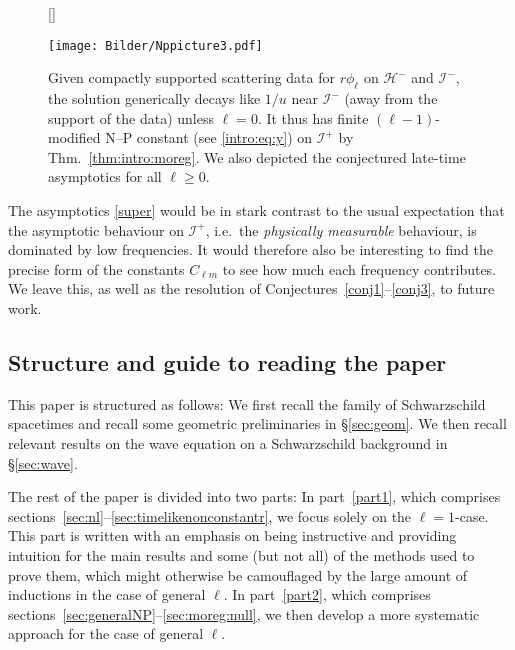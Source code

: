 \documentclass[11pt,english]{article}
\numberwithin{equation}{section}
\theoremstyle{remark}
\theoremstyle{plain}
\theoremstyle{remark}
\renewcommand{\(}{\left(}
\renewcommand{\)}{\right)}
\begin{document}
\begin{figure}[htbp]
[\FBwidth]
{\caption{%
Given compactly supported scattering data for $r\phi_\ell$ on $\mathcal H^-$ and $\mathcal I^-$, the solution generically decays like $1/u$ near $\mathcal I^-$ (away from the support of the data) unless $\ell=0$. It thus has finite $(\ell-1)$-modified N--P constant (see \eqref{intro:eq:y}) on $\mathcal I^+$ by Thm.~\ref{thm:intro:moreg}. We also depicted the conjectured late-time asymptotics for all $\ell\geq 0$.  }
\label{fig:III:3}}
{\texttt{[image: Bilder/Nppicture3.pdf]}}
\end{figure}


The asymptotics \eqref{super} would be in stark contrast to the usual expectation that the asymptotic behaviour on $\mathcal I^+$, i.e.\ the \textit{physically measurable} behaviour, is dominated by low frequencies. 
It would therefore also be interesting to find the precise form of the constants $ C_{\ell m}$ to see how much each frequency contributes. We leave this, as well as the resolution of Conjectures~\ref{conj1}--\ref{conj3}, to future work.



\subsection{Structure and guide to reading the paper}\label{sec:intro:gouda}
This paper is structured as follows:
We first recall the family of Schwarzschild spacetimes and recall some geometric preliminaries in \S\ref{sec:geom}. We  then recall relevant results on the wave equation on a Schwarzschild background in \S\ref{sec:wave}. 

The rest of the paper is divided into two parts: In part~\ref{part1}, which comprises sections~\ref{sec:nl}--\ref{sec:timelikenonconstantr}, we focus solely on the $\ell=1$-case. 
This part is written with an emphasis on being instructive and providing intuition for the main results and some (but not all) of the methods used to prove them, which might otherwise be camouflaged by the large amount of inductions in the case of general $\ell$. 
In part~\ref{part2}, which comprises sections~\ref{sec:generalNP}--\ref{sec:moreg:null}, we then develop a more systematic approach for the case of general $\ell$. 
\end{document}
